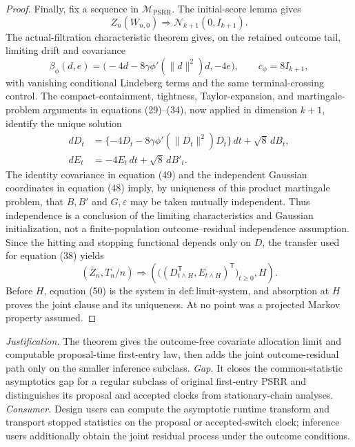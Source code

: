 \documentclass{article}
\begin{document}
\begin{proof}
Finally, fix a sequence in \(\mathcal M_{\mathrm{PSRR}}\). The initial-score lemma gives
\[
 Z_n(W_{n,0})\Rightarrow\mathcal N_{k+1}(0,I_{k+1}). \tag{48}
\]
The actual-filtration characteristic theorem gives, on the retained outcome tail, limiting drift and covariance
\[
 \beta_\phi(d,e)=
 \bigl(-4d-8\gamma\phi'(\|d\|^2)d,-4e\bigr),
 \qquad c_\phi=8I_{k+1}, \tag{49}
\]
with vanishing conditional Lindeberg terms and the same terminal-crossing control. The compact-containment, tightness, Taylor-expansion, and martingale-problem arguments in equations (29)--(34), now applied in dimension \(k+1\), identify the unique solution
\[
 \begin{split}
 dD_t&=\{-4D_t-8\gamma\phi'(\|D_t\|^2)D_t\}\,dt+\sqrt8\,dB_t,\\
 dE_t&=-4E_t\,dt+\sqrt8\,dB'_t.
 \end{split} \tag{50}
\]
The identity covariance in equation (49) and the independent Gaussian coordinates in equation (48) imply, by uniqueness of this product martingale problem, that \(B,B'\) and \(G,\varepsilon\) may be taken mutually independent. Thus independence is a conclusion of the limiting characteristics and Gaussian initialization, not a finite-population outcome--residual independence assumption. Since the hitting and stopping functional depends only on \(D\), the transfer used for equation (38) yields
\[
 (\bar Z_n,T_n/n)\Rightarrow
 \left(\bigl((D_{t\wedge H}^{\mathsf T},E_{t\wedge H})^{\mathsf T}\bigr)_{t\ge0},H\right). \tag{51}
\]
Before \(H\), equation (50) is the system in \(\mathrm{def{:}limit\mbox{-}system}\), and absorption at \(H\) proves the joint clause and its uniqueness. At no point was a projected Markov property assumed.
\end{proof}
\par\smallskip\noindent \textit{Justification.} The theorem gives the outcome-free covariate allocation limit and computable proposal-time first-entry law, then adds the joint outcome-residual path only on the smaller inference subclass. \textit{Gap.} It closes the common-statistic asymptotics gap for a regular subclass of original first-entry PSRR and distinguishes its proposal and accepted clocks from stationary-chain analyses. \textit{Consumer.} Design users can compute the asymptotic runtime transform and transport stopped statistics on the proposal or accepted-switch clock; inference users additionally obtain the joint residual process under the outcome conditions.
\end{document}
